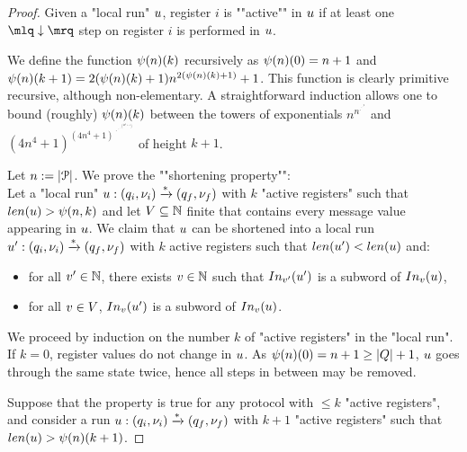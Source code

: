 \begin{proof}
	Given a "local run" $u$, register $i$ is ""active"" in $u$ if at least one $\quotemarks{\enregact}$ step on register $i$ is performed in $u$. 
	
	We define the function $\psi(n)(k)$ recursively as $\psi(n)(0) = n+1$ and $\psi(n)(k+1) = 2(\psi(n)(k) +1) n^{2(\psi(n)(k)+1)} +1$. This function is clearly primitive recursive, although non-elementary. A straightforward induction allows one to bound (roughly) $\psi(n)(k)$ between the towers of exponentials
	$n^{n^{{\scriptstyle\cdot^{\scriptstyle\cdot^{\scriptstyle\cdot^{\scriptstyle n}}}}}}$ and $(4n^4+1)^{(4n^4+1)^{\scriptstyle {~\cdot^{\scriptstyle~\cdot^{\scriptstyle~\cdot^{\scriptstyle (4n^4+1)}}}}}}$  of height $k+1$. 
	
	Let $n:=|\mathcal{P}|$.
	We prove the ""shortening property"": \\
	Let a "local run" $u: (q_i, \nu_i) \xrightarrow{*} (q_f, \nu_f)$ with $k$ "active registers" such that $\length{\localrun} > \towerfun(n,k)$ and let $V \subseteq \mathbb{N}$ finite that contains every message value appearing in $u$. We claim that $u$ can be shortened into a local run $u': (q_i, \nu_i) \xrightarrow{*} (q_f, \nu_f)$ with $k$ active registers such that $\length{\localrun'} < \length{\localrun}$ and:
	\begin{itemize}
		\item for all $v' \in \mathbb{N}$, there exists $v \in \mathbb{N}$ such that $\vinput{\aval'}{\localrun'}$ is a subword of $\vinput{\aval}{\localrun}$,
		\item for all $v \in V$, $\vinput{\aval}{\localrun'}$ is a subword of $\vinput{\aval}{\localrun}$. 
	\end{itemize}
	
	We proceed by induction on the number $k$ of "active registers" in the "local run". If $k=0$, register values do not change in $u$. As $\psi(n)(0) = n+1 \geq |Q|+1$, $u$ goes through the same state twice, hence all steps in between may be removed. 
	
	Suppose that the property is true for any protocol with $\leq k$ "active registers", and consider a run $u: (q_i,\nu_i) \xrightarrow{*} (q_f,\nu_f)$ with $k+1$ "active registers" such that $\length{\localrun} > \towerfun(n)(k+1)$.
	

\end{proof}
